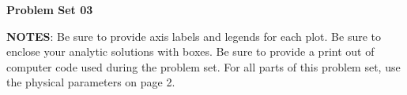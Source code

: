 
\renewcommand{\DocTitle}{Problem Set 03}
\noprintanswers


\begin{center}
\textbf{\DocTitle}
\end{center}
\textbf{NOTES}: 
Be sure to provide axis labels and legends for each plot.
Be sure to enclose your analytic solutions with boxes.
Be sure to provide a print out of computer code used during the problem set.
For all parts of this problem set, use the physical parameters on page 2.


